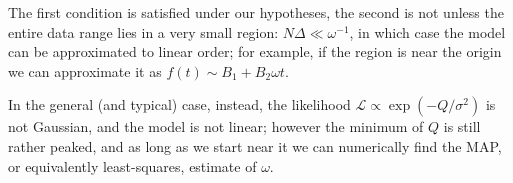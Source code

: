 \documentclass[main.tex]{subfiles}
\begin{document}
The first condition is satisfied under our hypotheses, the second is not unless the entire data range lies in a very small region: \(N \Delta  \ll \omega^{-1}\), in which case the model can be approximated to linear order; for example, if the region is near the origin we can approximate it as \(f(t) \sim B_1 + B_2 \omega t\).

In the general (and typical) case, instead, the likelihood \(\mathscr{L} \propto \exp(- Q / \sigma^2)\) is not Gaussian, and the model is not linear; however the minimum of \(Q\) is still rather peaked, and as long as we start near it we can numerically find the MAP, or equivalently least-squares, estimate of \(\omega \). 
\end{document}
